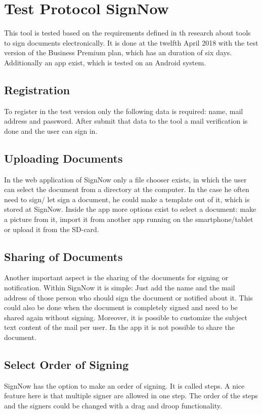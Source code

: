 \section{Test Protocol SignNow}
This tool is tested based on the requirements defined in th research about tools to sign documents electronically. It is done at the twelfth April 2018 with the test version of the Business Premium plan, which has an duration of six days. Additionally an \gls{app} exist, which is tested on an Android system.

\subsection{Registration}
To register in the test version only the following data is required: name, mail address and password. After submit that data to the tool a mail verification is done and the user can sign in.

\subsection{Uploading Documents}
In the web application of SignNow only a file chooser exists, in which the user can select the document from a directory at the computer. In the case he often need to sign/ let sign a document, he could make a template out of it, which is stored at SignNow. Inside the \gls{app} more options exist to select a document: make a picture from it, import it from another \gls{app} running on the smartphone/tablet or upload it from the SD-card.  

\subsection{Sharing of Documents}
Another important aspect is the sharing of the documents for signing or notification. Within SignNow it is simple: Just add the name and the mail address of those person who should sign the document or notified about it. This could also be done when the document is completely signed and need to be shared again without signing. Moreover, it is possible to customize the subject text content of the mail per user. In the \gls{app} it is not possible to share the document.

\subsection{Select Order of Signing}
SignNow has the option to make an order of signing. It is called steps. A nice feature here is that multiple signer are allowed in one step. The order of the steps and the signers could be changed with a drag and droop functionality.

